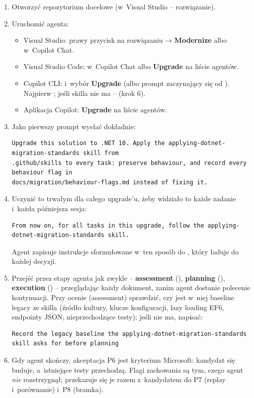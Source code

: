 \begin{enumerate}
  \item Otworzyć repozytorium docelowe (w~Visual Studio -- rozwiązanie).
  \item Uruchomić agenta:
        \begin{itemize}
          \item Visual Studio: prawy przycisk na rozwiązaniu → \textbf{Modernize} albo
                 w~Copilot Chat.
          \item Visual Studio Code:  w~Copilot Chat albo \textbf{Upgrade}
                na liście agentów.
          \item Copilot CLI:  i~wybór \textbf{Upgrade} (albo prompt zaczynający
                się od ). Najpierw ; jeśli skilla nie
                ma --  (krok 6).
          \item Aplikacja Copilot: \textbf{Upgrade} na liście agentów.
        \end{itemize}
  \item Jako pierwszy prompt wysłać dokładnie:
\begin{lstlisting}
Upgrade this solution to .NET 10. Apply the applying-dotnet-migration-standards skill from
.github/skills to every task: preserve behaviour, and record every behaviour flag in
docs/migration/behaviour-flags.md instead of fixing it.
\end{lstlisting}
  \item Uczynić to trwałym dla całego upgrade'u, żeby widziało to każde zadanie i~każda
        późniejsza sesja:
\begin{lstlisting}
From now on, for all tasks in this upgrade, follow the applying-dotnet-migration-standards skill.
\end{lstlisting}
        Agent zapisuje instrukcje sformułowane w~ten sposób do
        , który ładuje do każdej
        decyzji.
  \item Przejść przez etapy agenta jak zwykle -- \textbf{assessment}
        (), \textbf{planning} (),
        \textbf{execution} () -- przeglądając każdy dokument, zanim agent
        dostanie polecenie kontynuacji. Przy ocenie (assessment) sprawdzić, czy jest w~niej
        baseline legacy ze skilla (źródło kultury, klucze konfiguracji, lazy loading EF6,
        endpointy JSON, nieprzechodzące testy); jeśli nie ma, napisać:
\begin{lstlisting}
Record the legacy baseline the applying-dotnet-migration-standards skill asks for before planning
\end{lstlisting}
  \item Gdy agent skończy, akceptacja P6 jest kryterium Microsoft: kandydat się buduje,
        a~istniejące testy przechodzą. Flagi zachowania są tym, czego agent \emph{nie}
        rozstrzygnął; przekazuje się je razem z~kandydatem do P7 (replay i~porównanie) i~P8
        (bramka).
\end{enumerate}

